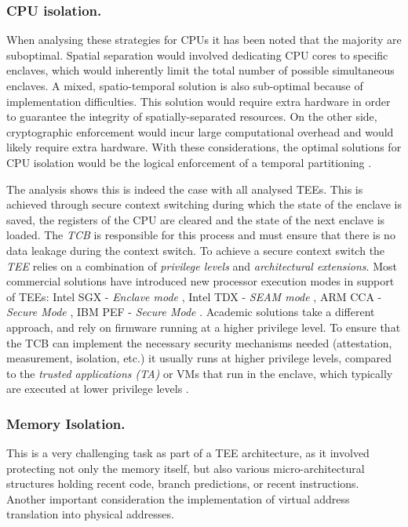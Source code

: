 \documentclass[runningheads,a4paper]{uwsese}
\begin{document}
\subsubsection{CPU isolation.}

When analysing these strategies for CPUs it has been noted that the majority
are suboptimal. Spatial separation would involved dedicating CPU cores to
specific enclaves, which would inherently limit the total number of possible
simultaneous enclaves. A mixed, spatio-temporal solution is also sub-optimal
because of implementation difficulties. This solution would require extra
hardware in order to guarantee the integrity of spatially-separated resources.
On the other side, cryptographic enforcement would incur large computational
overhead and would likely require extra hardware. With these considerations,
the optimal solutions for CPU isolation would be the logical enforcement of a
temporal partitioning \cite{tee_hw_sup}.

The analysis shows this is indeed the case with all analysed TEEs. This is
achieved through secure context switching during which the state of the enclave
is saved, the registers of the CPU are cleared and the state of the next
enclave is loaded. The \emph{TCB} is responsible for this process and must
ensure that there is no data leakage during the context switch. To achieve a
secure context switch the \emph{TEE} relies on a combination of \emph{privilege
levels} and \emph{architectural extensions}. Most commercial solutions have
introduced new processor execution modes in support of TEEs: Intel SGX -
\emph{Enclave mode} \cite{intel_sgx}, Intel TDX - \emph{SEAM mode}
\cite{intel_tdx}, ARM CCA - \emph{Secure Mode} \cite{arm_cca}, IBM PEF -
\emph{Secure Mode} \cite{ibm_pef}. Academic solutions take a different
approach, and rely on firmware running at a higher privilege level. To ensure
that the TCB can implement the necessary security mechanisms needed
(attestation, measurement, isolation, etc.) it usually runs at higher privilege
levels, compared to the \emph{trusted applications (TA)} or VMs that run in the
enclave, which typically are executed at lower privilege levels
\cite{tee_hw_sup}. 

\subsubsection{Memory Isolation.}
\label{mem_isolation}

This is a very challenging task as part of a TEE architecture, as it involved
protecting not only the memory itself, but also various micro-architectural
structures holding recent code, branch predictions, or recent instructions.
Another important consideration the implementation of virtual address
translation into physical addresses.
\end{document}
